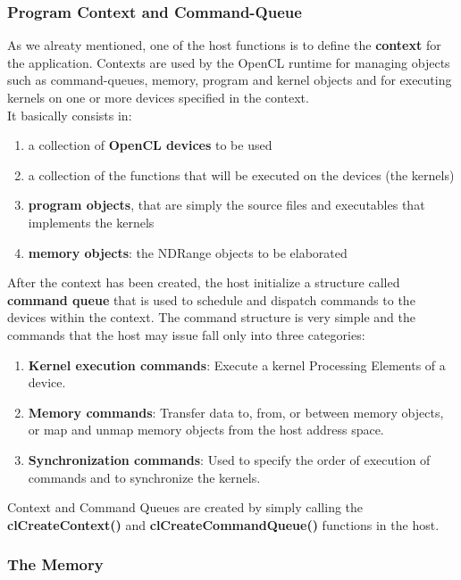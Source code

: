 \subsubsection{Program Context and Command-Queue} \label{sect:context}

As we alreaty mentioned, one of the host functions is to define the \textbf{context} for the application. Contexts are used by the OpenCL runtime for managing objects such as command-queues, memory, program and kernel objects and for executing kernels on one or more devices specified in the context.\\
It basically consists in:

\begin{enumerate}
	\item a collection of \textbf{OpenCL devices} to be used
	\item a collection of the functions that will be executed on the devices (the kernels)
	\item \textbf{program objects}, that are simply the source files and executables that implements the kernels
	\item \textbf{memory objects}: the NDRange objects to be elaborated
\end{enumerate}

After the context has been created, the host initialize a structure called \textbf{command queue} that is used to schedule and dispatch commands to the devices within the context. The command structure is very simple and the commands that the host may issue fall only into three categories:

\begin{enumerate}
	\item \textbf{Kernel execution commands}: Execute a kernel Processing Elements of a device.
	\item \textbf{Memory commands}: Transfer data to, from, or between memory objects, or map and unmap
memory objects from the host address space.
	\item	\textbf{Synchronization commands}: Used to specify the order of execution of commands and to synchronize the kernels.
\end{enumerate}

\begin{CLCode}
Context and Command Queues are created by simply calling the \textbf{clCreateContext()} and \textbf{clCreateCommandQueue() 
} functions in the host.
\end{CLCode}


\subsubsection{The Memory}

